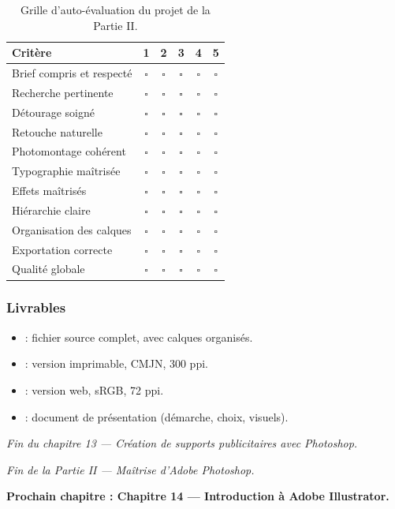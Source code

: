 \begin{table}[h!]
\centering
\begin{tabular}{@{}lccccc@{}}
\toprule
\textbf{Critère} & \textbf{1} & \textbf{2} & \textbf{3} & \textbf{4} & \textbf{5} \\
\midrule
Brief compris et respecté & \(\square\) & \(\square\) & \(\square\) & \(\square\) & \(\square\) \\
Recherche pertinente & \(\square\) & \(\square\) & \(\square\) & \(\square\) & \(\square\) \\
Détourage soigné & \(\square\) & \(\square\) & \(\square\) & \(\square\) & \(\square\) \\
Retouche naturelle & \(\square\) & \(\square\) & \(\square\) & \(\square\) & \(\square\) \\
Photomontage cohérent & \(\square\) & \(\square\) & \(\square\) & \(\square\) & \(\square\) \\
Typographie maîtrisée & \(\square\) & \(\square\) & \(\square\) & \(\square\) & \(\square\) \\
Effets maîtrisés & \(\square\) & \(\square\) & \(\square\) & \(\square\) & \(\square\) \\
Hiérarchie claire & \(\square\) & \(\square\) & \(\square\) & \(\square\) & \(\square\) \\
Organisation des calques & \(\square\) & \(\square\) & \(\square\) & \(\square\) & \(\square\) \\
Exportation correcte & \(\square\) & \(\square\) & \(\square\) & \(\square\) & \(\square\) \\
Qualité globale & \(\square\) & \(\square\) & \(\square\) & \(\square\) & \(\square\) \\
\bottomrule
\end{tabular}
\caption{Grille d'auto-évaluation du projet de la Partie II.}
\end{table}

\subsubsection*{Livrables}

\begin{itemize}
    \item {} : fichier source complet, avec calques organisés.
    \item {} : version imprimable, CMJN, 300 ppi.
    \item {} : version web, sRGB, 72 ppi.
    \item {} : document de présentation (démarche, choix, visuels).
\end{itemize}

\vspace{2em}

\begin{center}
\textit{Fin du chapitre 13 --- Création de supports publicitaires avec Photoshop.}

\vspace{1em}

\textit{Fin de la Partie II --- Maîtrise d'Adobe Photoshop.}

\vspace{1em}

\textbf{Prochain chapitre : Chapitre 14 --- Introduction à Adobe Illustrator.}
\end{center}